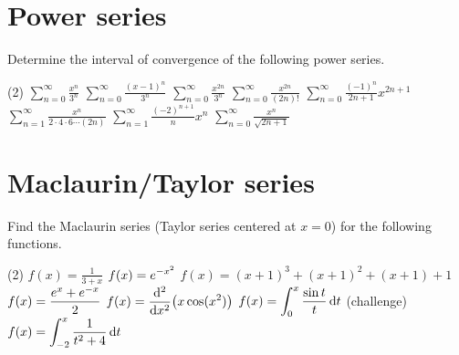 \documentclass{discussion}
\author{Sections B04 and B06}
\date{Fall 2024}
\begin{document}
\section{Power series}

\begin{question}
    Determine the interval of convergence of the following power series.
    \begin{tasks}[label={\arabic*.}](2)
        \task \(\displaystyle \sum_{n=0}^\infty \frac{x^n}{3^n}\)
        \task \(\displaystyle \sum_{n=0}^\infty \frac{(x-1)^n}{3^n}\)
        \task \(\displaystyle \sum_{n=0}^\infty \frac{x^{2n}}{3^n}\)
        \task \(\displaystyle \sum_{n=0}^\infty \frac{x^{2n}}{(2n)!}\)
        \task \(\displaystyle \sum_{n=0}^\infty \frac{(-1)^n}{2n+1} x^{2n+1}\)
        \task \(\displaystyle \sum_{n=1}^\infty \frac{x^n}{2 \cdot 4 \cdot 6 \cdots (2n)}\)
        \task \(\displaystyle \sum_{n=1}^\infty \frac{(-2)^{n+1}}{n} x^n\)
        \task \(\displaystyle \sum_{n=0}^\infty \frac{x^n}{\sqrt{2n+1}}\)
    \end{tasks}
\end{question}

\vspace{20pt}

\section{Maclaurin/Taylor series}

\begin{question}
    Find the Maclaurin series (Taylor series centered at \(x = 0\)) for the following functions.
    \begin{tasks}[label={\arabic*.}](2)
        \task \(\displaystyle f(x) = \frac{1}{3 + x}\)
        \task \(\displaystyle f(x) = e^{-x^2}\)
        \task \(\displaystyle f(x) = (x+1)^3 + (x+1)^2 + (x + 1) + 1\)
        \task \(\displaystyle f(x) = \frac{e^{x} + e^{-x}}{2}\)
        \task \(\displaystyle f(x) = \odv[order=2]{}{x} \bigl( x \cos (x^2) \bigr)\)
        \task \(\displaystyle f(x) = \int_{0}^{x} \frac{\sin t}{t} \odif{t}\)
        \task (challenge) \(\displaystyle f(x) = \int_{-2}^{x} \frac{1}{t^2 + 4} \odif{t}\)
    \end{tasks}
\end{question}
\end{document}
